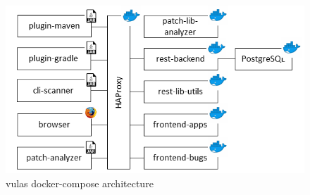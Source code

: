 \documentclass[11pt]{article}
\begin{document}
\begin{figure}[h]
    \centering
    \includegraphics[width=\textwidth]{vulas_docker_architecture.png}
    \caption{vulas docker-compose architecture}
    \label{fig:vulas_docker}
\end{figure}
\end{document}
